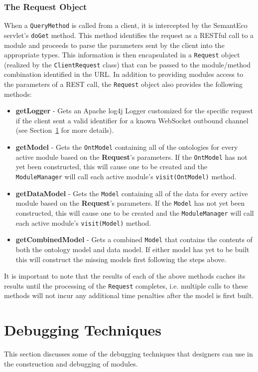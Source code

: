 \documentclass[letterpaper]{report}
\begin{document}
\subsubsection{The Request Object}
\label{request-object}
When a \texttt{QueryMethod} is called from a client, it is intercepted by the SemantEco servlet's \texttt{doGet} method. This method identifies the request as a RESTful call to a module and proceeds to parse the parameters sent by the client into the appropriate types. This information is then encapsulated in a \texttt{Request} object (realized by the \texttt{ClientRequest} class) that can be passed to the module/method combination identified in the URL. In addition to providing modules access to the parameters of a REST call, the \texttt{Request} object also provides the following methods:

\begin{itemize}
\item\textbf{getLogger} - Gets an Apache log4j Logger customized for the specific request if the client sent a valid identifier for a known WebSocket outbound channel (see Section~\ref{debugging-techniques} for more details).
\item\textbf{getModel} - Gets the \texttt{OntModel} containing all of the ontologies for every active module based on the \textbf{Request}'s parameters. If the \texttt{OntModel} has not yet been constructed, this will cause one to be created and the \texttt{ModuleManager} will call each active module's \texttt{visit(OntModel)} method.
\item\textbf{getDataModel} - Gets the \texttt{Model} containing all of the data for every active module based on the \textbf{Request}'s parameters. If the \texttt{Model} has not yet been constructed, this will cause one to be created and the \texttt{ModuleManager} will call each active module's \texttt{visit(Model)} method.
\item\textbf{getCombinedModel} - Gets a combined \texttt{Model} that contains the contents of both the ontology model and data model. If either model has yet to be built this will construct the missing models first following the steps above.
\end{itemize}

It is important to note that the results of each of the above methods caches its results until the processing of the \texttt{Request} completes, i.e. multiple calls to these methods will not incur any additional time penalties after the model is first built.

\section{Debugging Techniques}
\label{debugging-techniques}
This section discusses some of the debugging techniques that designers can use in the construction and debugging of modules.
\end{document}
